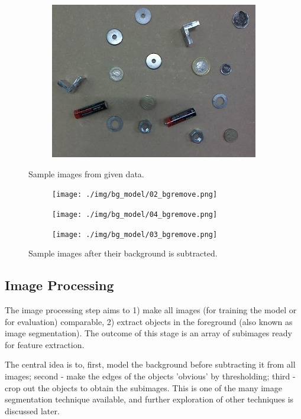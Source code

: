 \documentclass[main.tex]{subfiles}
\begin{document}
\begin{figure}[!h]
\begin{subfigure}[b]{.3\textwidth}
    \includegraphics[width=\textwidth]{./img/sample_fig/03.jpg}
  \end{subfigure}
  \caption{Sample images from given data.}
  \label{montage_data}
\end{figure}
\begin{figure}[!h]
  \centering
  \begin{subfigure}[b]{.3\textwidth}
    \centering
    \texttt{[image: ./img/bg\_model/02\_bgremove.png]}
  \end{subfigure}
  \begin{subfigure}[b]{.3\textwidth}
    \centering
    \texttt{[image: ./img/bg\_model/04\_bgremove.png]}
  \end{subfigure}
  \begin{subfigure}[b]{.3\textwidth}
    \centering
    \texttt{[image: ./img/bg\_model/03\_bgremove.png]}
  \end{subfigure}
  \caption{Sample images after their background is subtracted.}
  \label{montage_data_bgremove}
\end{figure}

\subsection{Image Processing}
The image processing step aims to 1) make all images (for training the model or for evaluation) comparable, 2) extract objects in the foreground (also known as image segmentation). The outcome of this stage is an array of subimages ready for feature extraction.

The central idea is to, first, model the background before subtracting it from all images; second - make the edges of the objects 'obvious' by thresholding; third - crop out the objects to obtain the subimages. This is one of the many image segmentation technique available, and further exploration of other techniques is discussed later.
\end{document}
